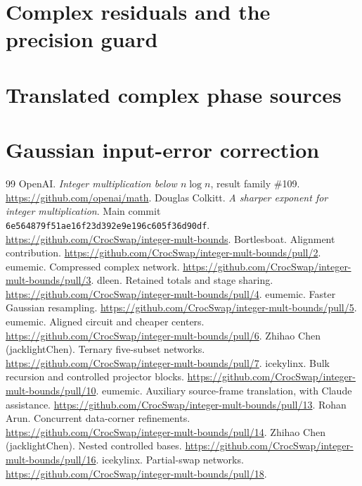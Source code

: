 \documentclass[11pt]{article}
\begin{document}
\section{Complex residuals and the precision guard}

\section{Translated complex phase sources}


\section{Gaussian input-error correction}


\begin{thebibliography}{99}
 OpenAI. \emph{Integer multiplication below $n\log n$},
result family \#109. \url{https://github.com/openai/math}.
 Douglas Colkitt. \emph{A sharper exponent for integer
multiplication}. Main commit
\texttt{6e564879f51ae16f23d392e9e196c605f36d90df}.
\url{https://github.com/CrocSwap/integer-mult-bounds}.
 Bortlesboat. Alignment contribution.
\url{https://github.com/CrocSwap/integer-mult-bounds/pull/2}.
 eumemic. Compressed complex network.
\url{https://github.com/CrocSwap/integer-mult-bounds/pull/3}.
 dleen. Retained totals and stage sharing.
\url{https://github.com/CrocSwap/integer-mult-bounds/pull/4}.
 eumemic. Faster Gaussian resampling.
\url{https://github.com/CrocSwap/integer-mult-bounds/pull/5}.
 eumemic. Aligned circuit and cheaper centers.
\url{https://github.com/CrocSwap/integer-mult-bounds/pull/6}.
 Zhihao Chen (jacklightChen). Ternary five-subset networks.
\url{https://github.com/CrocSwap/integer-mult-bounds/pull/7}.
 icekylinx. Bulk recursion and controlled projector blocks.
\url{https://github.com/CrocSwap/integer-mult-bounds/pull/10}.
 eumemic. Auxiliary source-frame translation, with Claude assistance.
\url{https://github.com/CrocSwap/integer-mult-bounds/pull/13}.
 Rohan Arun. Concurrent data-corner refinements.
\url{https://github.com/CrocSwap/integer-mult-bounds/pull/14}.
 Zhihao Chen (jacklightChen). Nested controlled bases.
\url{https://github.com/CrocSwap/integer-mult-bounds/pull/16}.
 icekylinx. Partial-swap networks.
\url{https://github.com/CrocSwap/integer-mult-bounds/pull/18}.
\end{thebibliography}
\end{document}
